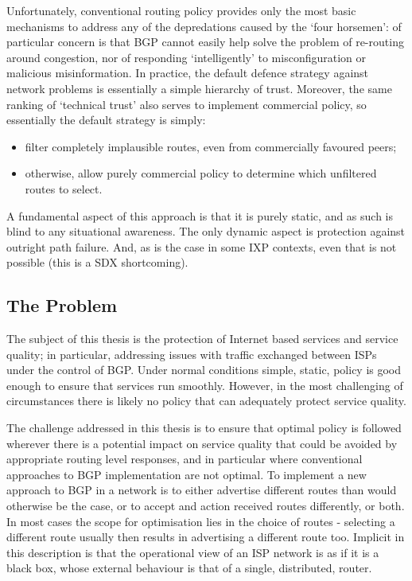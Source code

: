 	{Unfortunately, conventional routing policy provides only the most basic mechanisms to address any of the depredations caused by the `four horsemen': of particular concern is that BGP cannot easily help solve the problem of re-routing around congestion, nor of responding `intelligently' to misconfiguration or malicious misinformation.
		In practice, the default defence strategy against network problems is essentially a simple hierarchy of trust. Moreover, the same ranking of `technical trust' also serves to implement commercial policy, so essentially the default strategy is simply:
		\begin{itemize}
			\item filter completely implausible routes, even from commercially favoured peers;
			\item otherwise, allow purely commercial policy to determine which unfiltered routes to select.
		\end{itemize}

		A fundamental aspect of this approach is that it is purely static, and as such is blind to any situational awareness.
		The only dynamic aspect is protection against outright path failure.
		And, as is the case in some IXP contexts, even that is not possible (this is a SDX shortcoming).}

\subsection{The Problem}

The subject of this thesis is the protection of Internet based services and service quality; in particular, addressing issues with traffic exchanged between ISPs under the control of BGP.
Under normal conditions simple, static, policy is good enough to ensure that services run smoothly. However, in the most challenging of circumstances there is likely no policy that can adequately protect service quality.

The challenge addressed in this thesis is to ensure that optimal policy is followed wherever there is a potential impact on service quality that could be avoided by appropriate routing level responses, and in particular where conventional approaches to BGP implementation are not optimal.
To implement a new approach to BGP in a network is to either advertise different routes than would otherwise be the case, or to accept and action received routes differently, or both. In most cases the scope for optimisation lies in the choice of routes - selecting a different route usually then results in advertising a different route too.
Implicit in this description is that the operational view of an ISP network is as if it is a black box, whose external behaviour is that of a single, distributed, router.

